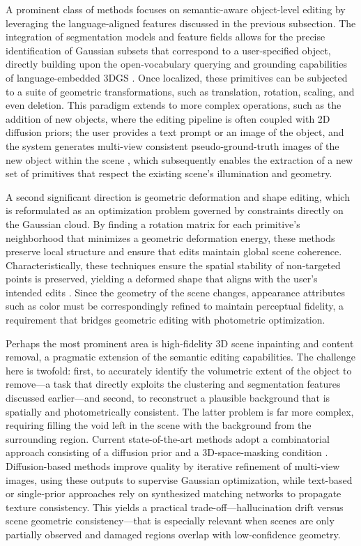\documentclass[11pt,a4paper]{article}
\begin{document}
A prominent class of methods focuses on semantic-aware object-level editing by leveraging the language-aligned features discussed in the previous subsection. The integration of segmentation models and feature fields allows for the precise identification of Gaussian subsets that correspond to a user-specified object, directly building upon the open-vocabulary querying and grounding capabilities of language-embedded 3DGS \cite{arxiv:2603.01099v2,arxiv:2412.16809v2}. Once localized, these primitives can be subjected to a suite of geometric transformations, such as translation, rotation, scaling, and even deletion. This paradigm extends to more complex operations, such as the addition of new objects, where the editing pipeline is often coupled with 2D diffusion priors; the user provides a text prompt or an image of the object, and the system generates multi-view consistent pseudo-ground-truth images of the new object within the scene \cite{arxiv:2605.07287v2}, which subsequently enables the extraction of a new set of primitives that respect the existing scene's illumination and geometry.

A second significant direction is geometric deformation and shape editing, which is reformulated as an optimization problem governed by constraints directly on the Gaussian cloud. By finding a rotation matrix for each primitive's neighborhood that minimizes a geometric deformation energy, these methods preserve local structure and ensure that edits maintain global scene coherence. Characteristically, these techniques ensure the spatial stability of non-targeted points is preserved, yielding a deformed shape that aligns with the user's intended edits \cite{arxiv:2602.06830v1,arxiv:2604.28016v1}. Since the geometry of the scene changes, appearance attributes such as color must be correspondingly refined to maintain perceptual fidelity, a requirement that bridges geometric editing with photometric optimization.

Perhaps the most prominent area is high-fidelity 3D scene inpainting and content removal, a pragmatic extension of the semantic editing capabilities. The challenge here is twofold: first, to accurately identify the volumetric extent of the object to remove---a task that directly exploits the clustering and segmentation features discussed earlier---and second, to reconstruct a plausible background that is spatially and photometrically consistent. The latter problem is far more complex, requiring filling the void left in the scene with the background from the surrounding region. Current state-of-the-art methods adopt a combinatorial approach consisting of a diffusion prior and a 3D-space-masking condition \cite{arxiv:2603.06216v1}. Diffusion-based methods improve quality by iterative refinement of multi-view images, using these outputs to supervise Gaussian optimization, while text-based or single-prior approaches rely on synthesized matching networks to propagate texture consistency. This yields a practical trade-off---hallucination drift versus scene geometric consistency---that is especially relevant when scenes are only partially observed and damaged regions overlap with low-confidence geometry.
\end{document}
